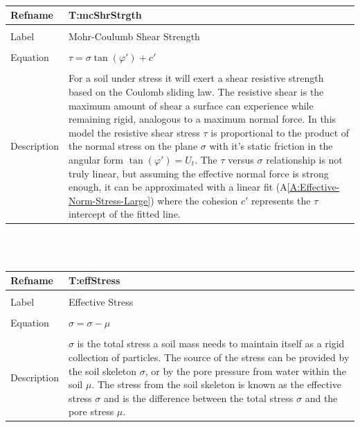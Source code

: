 \documentclass[12pt]{article}
\begin{document}
~\newline
\noindent \begin{minipage}{\textwidth}
\begin{tabular}{p{} p{}}
\toprule \textbf{Refname} & \textbf{T:mcShrStrgth}
\label{T:mcShrStrgth}
\\ \midrule \\
Label & Mohr-Coulumb Shear Strength
\\ \midrule \\
Equation & $τ=σ \tan\left(φ'\right)+c'$
\\ \midrule \\
Description & For a soil under stress it will exert a shear resistive strength based on the Coulomb sliding law. The resistive shear is the maximum amount of shear a surface can experience while remaining rigid, analogous to a maximum normal force. In this model the resistive shear stress $τ$ is proportional to the product of the normal stress on the plane $σ$ with it's static friction in the angular form $\tan\left(φ'\right)={U_{t}}$. The $τ$ versus $σ$ relationship is not truly linear, but assuming the effective normal force is strong enough, it can be approximated with a linear fit (A\ref{A:Effective-Norm-Stress-Large}) where the cohesion $c'$ represents the $τ$ intercept of the fitted line.
\\ \bottomrule \end{tabular}
\end{minipage}\\
~\newline
\noindent \begin{minipage}{\textwidth}
\begin{tabular}{p{} p{}}
\toprule \textbf{Refname} & \textbf{T:effStress}
\label{T:effStress}
\\ \midrule \\
Label & Effective Stress
\\ \midrule \\
Equation & $σ=σ-μ$
\\ \midrule \\
Description & $σ$ is the total stress a soil mass needs to maintain itself as a rigid collection of particles. The source of the stress can be provided by the soil skeleton $σ$, or by the pore pressure from water within the soil $μ$. The stress from the soil skeleton is known as the effective stress $σ$ and is the difference between the total stress $σ$ and the pore stress $μ$.
\\ \bottomrule \end{tabular}
\end{minipage}\\
\end{document}
